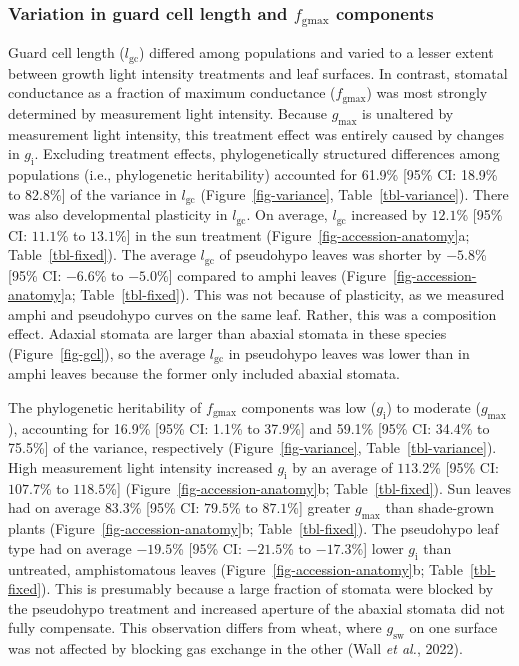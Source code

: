 \documentclass[
  letterpaper,
  DIV=11,
  numbers=noendperiod]{scrartcl}
\newcommand{\fgmax}{$f_\mathrm{gmax}$}
\newcommand{\gcl}{$l_\mathrm{gc}$}
\newcommand{\gi}{$g_\mathrm{i}$}
\newcommand{\gmax}{$g_\mathrm{max}$}
\newcommand{\gsw}{$g_\mathrm{sw}$}
\begin{document}
\subsubsection{\texorpdfstring{Variation in guard cell length and
\fgmax{}
components}{Variation in guard cell length and  components}}\label{variation-in-guard-cell-length-and-components}

Guard cell length (\gcl) differed among populations and varied to a
lesser extent between growth light intensity treatments and leaf
surfaces. In contrast, stomatal conductance as a fraction of maximum
conductance (\fgmax) was most strongly determined by measurement light
intensity. Because \gmax{} is unaltered by measurement light intensity,
this treatment effect was entirely caused by changes in \gi. Excluding
treatment effects, phylogenetically structured differences among
populations (i.e., phylogenetic heritability) accounted for 61.9\%
{[}95\% CI: 18.9\% to 82.8\%{]} of the variance in \gcl{}
(Figure~\ref{fig-variance}, Table~\ref{tbl-variance}). There was also
developmental plasticity in \gcl. On average, \gcl{} increased by
\(12.1\)\% {[}95\% CI: \(11.1\)\% to \(13.1\)\%{]} in the sun treatment
(Figure~\ref{fig-accession-anatomy}a; Table~\ref{tbl-fixed}). The
average \gcl{} of pseudohypo leaves was shorter by \(-5.8\)\% {[}95\%
CI: \(-6.6\)\% to \(-5.0\)\%{]} compared to amphi leaves
(Figure~\ref{fig-accession-anatomy}a; Table~\ref{tbl-fixed}). This was
not because of plasticity, as we measured amphi and pseudohypo curves on
the same leaf. Rather, this was a composition effect. Adaxial stomata
are larger than abaxial stomata in these species (Figure~\ref{fig-gcl}),
so the average \gcl{} in pseudohypo leaves was lower than in amphi
leaves because the former only included abaxial stomata.

The phylogenetic heritability of \fgmax{} components was low (\gi) to
moderate (\gmax), accounting for 16.9\% {[}95\% CI: 1.1\% to 37.9\%{]}
and 59.1\% {[}95\% CI: 34.4\% to 75.5\%{]} of the variance, respectively
(Figure~\ref{fig-variance}, Table~\ref{tbl-variance}). High measurement
light intensity increased \gi{} by an average of \(113.2\)\% {[}95\% CI:
\(107.7\)\% to \(118.5\)\%{]} (Figure~\ref{fig-accession-anatomy}b;
Table~\ref{tbl-fixed}). Sun leaves had on average \(83.3\)\% {[}95\% CI:
\(79.5\)\% to \(87.1\)\%{]} greater \gmax{} than shade-grown plants
(Figure~\ref{fig-accession-anatomy}b; Table~\ref{tbl-fixed}). The
pseudohypo leaf type had on average \(-19.5\)\% {[}95\% CI: \(-21.5\)\%
to \(-17.3\)\%{]} lower \gi{} than untreated, amphistomatous leaves
(Figure~\ref{fig-accession-anatomy}b; Table~\ref{tbl-fixed}). This is
presumably because a large fraction of stomata were blocked by the
pseudohypo treatment and increased aperture of the abaxial stomata did
not fully compensate. This observation differs from wheat, where \gsw{}
on one surface was not affected by blocking gas exchange in the other
(Wall \emph{et al.}, 2022).
\end{document}
